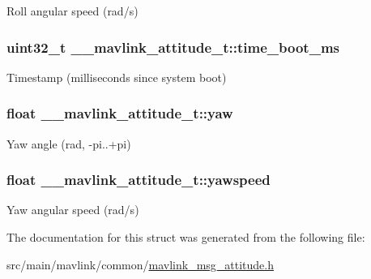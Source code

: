 Roll angular speed (rad/s) 

\hypertarget{struct____mavlink__attitude__t_a7330cabdd19ca8d3dc27ff1a6b585326}{
\subsubsection[{time\+\_\+boot\+\_\+ms}]{\setlength{\rightskip}{0pt plus 5cm}uint32\+\_\+t \+\_\+\+\_\+mavlink\+\_\+attitude\+\_\+t\+::time\+\_\+boot\+\_\+ms}}\label{struct____mavlink__attitude__t_a7330cabdd19ca8d3dc27ff1a6b585326}


Timestamp (milliseconds since system boot) 

\hypertarget{struct____mavlink__attitude__t_a24ce486ebd7bde1558ad456684bcbd93}{
\subsubsection[{yaw}]{\setlength{\rightskip}{0pt plus 5cm}float \+\_\+\+\_\+mavlink\+\_\+attitude\+\_\+t\+::yaw}}\label{struct____mavlink__attitude__t_a24ce486ebd7bde1558ad456684bcbd93}


Yaw angle (rad, -\/pi..+pi) 

\hypertarget{struct____mavlink__attitude__t_a2a6cd5ab90b6c939dec690ebf7000101}{
\subsubsection[{yawspeed}]{\setlength{\rightskip}{0pt plus 5cm}float \+\_\+\+\_\+mavlink\+\_\+attitude\+\_\+t\+::yawspeed}}\label{struct____mavlink__attitude__t_a2a6cd5ab90b6c939dec690ebf7000101}


Yaw angular speed (rad/s) 



The documentation for this struct was generated from the following file\+:\begin{DoxyCompactItemize}
\item 
src/main/mavlink/common/\hyperlink{mavlink__msg__attitude_8h}{mavlink\+\_\+msg\+\_\+attitude.\+h}\end{DoxyCompactItemize}
